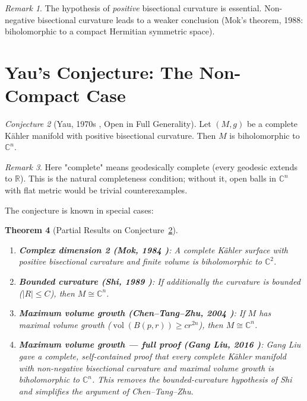 \documentclass[12pt,a4paper]{amsart}
\newtheorem{theorem}{Theorem}[section]
\theoremstyle{definition}
\theoremstyle{remark}
\newtheorem{remark}[theorem]{Remark}
\newtheorem{conjecture}[theorem]{Conjecture}
\DeclareMathOperator{\vol}{vol}
\newcommand{\CC}{\mathbb{C}}
\newcommand{\RR}{\mathbb{R}}
\begin{document}
\begin{remark}
The hypothesis of \emph{positive} bisectional curvature is essential.
Non-negative bisectional curvature leads to a weaker conclusion (Mok's
theorem, 1988: biholomorphic to a compact Hermitian symmetric space).
\end{remark}

\section{Yau's Conjecture: The Non-Compact Case}

\begin{conjecture}[Yau, 1970s \cite{Yau1977}, Open in Full Generality]
\label{conj:yau}
Let $(M, g)$ be a complete Kähler manifold with positive bisectional
curvature.  Then $M$ is biholomorphic to $\CC^n$.
\end{conjecture}

\begin{remark}
Here "complete" means geodesically complete (every geodesic extends to
$\RR$).  This is the natural completeness condition; without it,
open balls in $\CC^n$ with flat metric would be trivial counterexamples.
\end{remark}

The conjecture is known in special cases:

\begin{theorem}[Partial Results on Conjecture~\ref{conj:yau}]
\begin{enumerate}[label=(\roman*)]
  \item \textbf{Complex dimension 2 (Mok, 1984 \cite{Mok1984})}:
        A complete Kähler surface with positive bisectional curvature and
        finite volume is biholomorphic to $\CC^2$.
  \item \textbf{Bounded curvature (Shi, 1989 \cite{Shi1989})}:
        If additionally the curvature is bounded ($|R| \le C$), then
        $M \cong \CC^n$.
  \item \textbf{Maximum volume growth (Chen--Tang--Zhu, 2004 \cite{ChenTangZhu2004})}:
        If $M$ has maximal volume growth ($\vol(B(p,r)) \ge c r^{2n}$), then
        $M \cong \CC^n$.
  \item \textbf{Maximum volume growth — full proof (Gang Liu, 2016 \cite{GangLiu2016})}:
        Gang Liu gave a complete, self-contained proof that every complete
        Kähler manifold with non-negative bisectional curvature and
        \emph{maximal volume growth} is biholomorphic to $\CC^n$.  This
        removes the bounded-curvature hypothesis of Shi and simplifies
        the argument of Chen--Tang--Zhu.
\end{enumerate}
\end{theorem}
\end{document}
